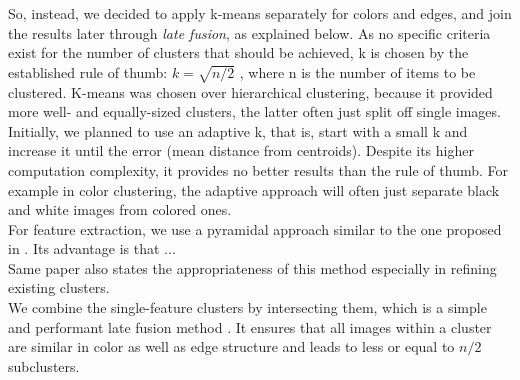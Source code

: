 So, instead, we decided to apply k-means separately for colors and edges, and join the results later through \emph{late fusion}, as explained below. As no specific criteria exist for the number of clusters that should be achieved, k is chosen by the established rule of thumb: $ k = \sqrt{n/2} $ \cite[p.365]{mardia1979}, where n is the number of items to be clustered. K-means was chosen over hierarchical clustering, because it provided more well- and equally-sized clusters, the latter often just split off single images.\\
Initially, we planned to use an adaptive k, that is, start with a small k and increase it until the error (mean distance from centroids). Despite its higher computation complexity, it provides no better results than the rule of thumb. For example in color clustering, the adaptive approach will often just separate black and white images from colored ones.\\
For feature extraction, we use a pyramidal approach similar to the one proposed in \cite{Lazebnik2006}. Its advantage is that ... \\
Same paper also states the appropriateness of this method especially in refining existing clusters.\\
We combine the single-feature clusters by intersecting them, which is a simple and performant late fusion method . It ensures that all images within a cluster are similar in color as well as edge structure and leads to less or equal to $ n/2 $ subclusters.
